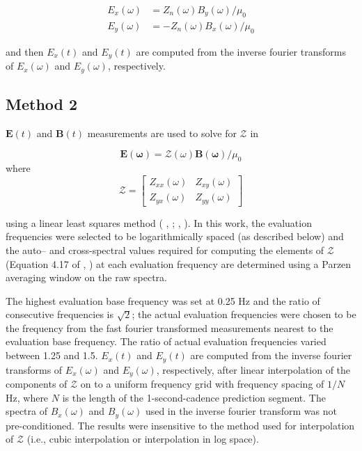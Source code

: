 \documentclass[12pt]{article}
\newcommand{\citeay}[1]{%
\citeauthor{#1}, \citeyear{#1}%
}
\begin{document}
\begin{equation}
\begin{split}
E_x(\omega) & = Z_n(\omega)B_y(\omega)/\mu_0\\
E_y(\omega) & = -Z_n(\omega)B_x(\omega)/\mu_0
\end{split}
\end{equation}

\noindent and then $E_x(t)$ and $E_y(t)$ are computed from the inverse fourier transforms of $E_x(\omega)$ and $E_y(\omega)$, respectively.

\subsection{Method 2}

$\mathbf{E}(t)$ and $\mathbf{B}(t)$ measurements are used to solve for $\mathcal{Z}$ in

\begin{equation}
\mathbf{E(\omega)} = \mathcal{Z(\omega)}\mathbf{B(\omega)}/\mu_0
\end{equation}
\noindent where
\begin{equation}
\mathcal{Z} = 
\begin{bmatrix}
Z_{xx}(\omega) & Z_{xy}(\omega)\\
Z_{yx}(\omega) & Z_{yy}(\omega)
\end{bmatrix}
\end{equation}

\noindent using a linear least squares method (\citeay{Sims1971}; \citeay{Simpson2005}).  In this work, the evaluation frequencies were selected to be logarithmically spaced (as described below) and the auto-- and cross-spectral values required for computing the elements of $\mathcal{Z}$ (Equation 4.17 of \citeay{Simpson2005}) at each evaluation frequency are determined using a Parzen averaging window on the raw spectra. 

The highest evaluation base frequency was set at 0.25 Hz and the ratio of consecutive frequencies is $\sqrt{2}$; the actual evaluation frequencies were chosen to be the frequency from the fast fourier transformed measurements nearest to the evaluation base frequency. The ratio of actual evaluation frequencies varied between 1.25 and 1.5.  $E_x(t)$ and $E_y(t)$ are computed from the inverse fourier transforms of $E_x(\omega)$ and $E_y(\omega)$, respectively, after linear interpolation of the components of $\mathcal{Z}$ on to a uniform frequency grid with frequency spacing of $1/N$ Hz, where $N$ is the length of the 1-second-cadence prediction segment.  The spectra of $B_x(\omega)$ and $B_y(\omega)$ used in the inverse fourier transform was not pre-conditioned.  The results were insensitive to the method used for interpolation of $\mathcal{Z}$ (i.e., cubic interpolation or interpolation in log space).
\end{document}

